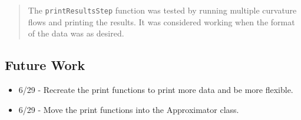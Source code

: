 \begin{quotation}
The \texttt{printResultsStep} function was tested by running multiple
curvature flows and printing the results. It was considered working when the
format of the data was as desired.
\end{quotation}

\subsection*{Future Work}

\begin{itemize}
\item 6/29 - Recreate the print functions to print more data and be more
flexible.

\item 6/29 - Move the print functions into the Approximator class.
\end{itemize}


%
